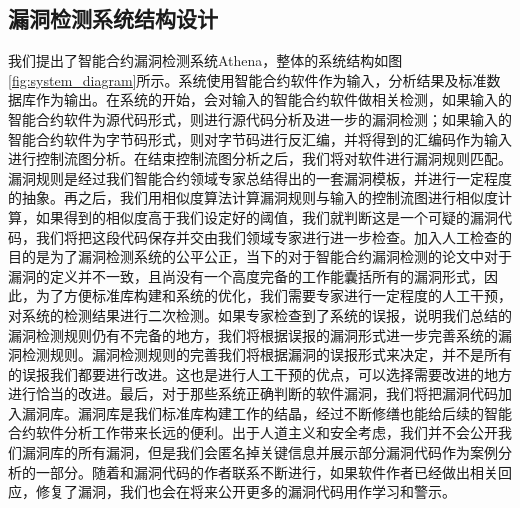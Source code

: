 \subsection{漏洞检测系统结构设计}
我们提出了智能合约漏洞检测系统Athena，整体的系统结构如图\ref{fig:system_diagram}所示。系统使用智能合约软件作为输入，分析结果及标准数据库作为输出。在系统的开始，会对输入的智能合约软件做相关检测，如果输入的智能合约软件为源代码形式，则进行源代码分析及进一步的漏洞检测；如果输入的智能合约软件为字节码形式，则对字节码进行反汇编，并将得到的汇编码作为输入进行控制流图分析。在结束控制流图分析之后，我们将对软件进行漏洞规则匹配。漏洞规则是经过我们智能合约领域专家总结得出的一套漏洞模板，并进行一定程度的抽象。再之后，我们用相似度算法计算漏洞规则与输入的控制流图进行相似度计算，如果得到的相似度高于我们设定好的阈值，我们就判断这是一个可疑的漏洞代码，我们将把这段代码保存并交由我们领域专家进行进一步检查。加入人工检查的目的是为了漏洞检测系统的公平公正，当下的对于智能合约漏洞检测的论文中对于漏洞的定义并不一致，且尚没有一个高度完备的工作能囊括所有的漏洞形式，因此，为了方便标准库构建和系统的优化，我们需要专家进行一定程度的人工干预，对系统的检测结果进行二次检测。如果专家检查到了系统的误报，说明我们总结的漏洞检测规则仍有不完备的地方，我们将根据误报的漏洞形式进一步完善系统的漏洞检测规则。漏洞检测规则的完善我们将根据漏洞的误报形式来决定，并不是所有的误报我们都要进行改进。这也是进行人工干预的优点，可以选择需要改进的地方进行恰当的改进。最后，对于那些系统正确判断的软件漏洞，我们将把漏洞代码加入漏洞库。漏洞库是我们标准库构建工作的结晶，经过不断修缮也能给后续的智能合约软件分析工作带来长远的便利。出于人道主义和安全考虑，我们并不会公开我们漏洞库的所有漏洞，但是我们会匿名掉关键信息并展示部分漏洞代码作为案例分析的一部分。随着和漏洞代码的作者联系不断进行，如果软件作者已经做出相关回应，修复了漏洞，我们也会在将来公开更多的漏洞代码用作学习和警示。
